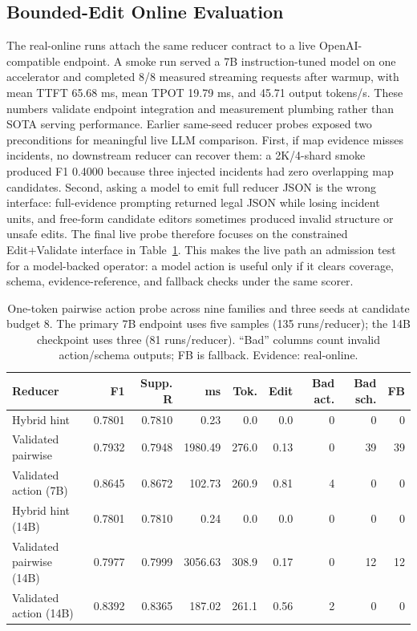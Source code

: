 \documentclass[sigplan,anonymous,nonacm]{acmart}
\begin{document}
\subsection{Bounded-Edit Online Evaluation}

The real-online runs attach the same reducer contract to a live OpenAI-compatible endpoint. A smoke run served a 7B instruction-tuned model on one accelerator and completed 8/8 measured streaming requests after warmup, with mean TTFT 65.68 ms, mean TPOT 19.79 ms, and 45.71 output tokens/s. These numbers validate endpoint integration and measurement plumbing rather than SOTA serving performance. Earlier same-seed reducer probes exposed two preconditions for meaningful live LLM comparison. First, if map evidence misses incidents, no downstream reducer can recover them: a 2K/4-shard smoke produced F1 0.4000 because three injected incidents had zero overlapping map candidates. Second, asking a model to emit full reducer JSON is the wrong interface: full-evidence prompting returned legal JSON while losing incident units, and free-form candidate editors sometimes produced invalid structure or unsafe edits. The final live probe therefore focuses on the constrained \textsf{Edit}+\textsf{Validate} interface in Table~\ref{tab:pairwise-action-online}. This makes the live path an admission test for a model-backed operator: a model action is useful only if it clears coverage, schema, evidence-reference, and fallback checks under the same scorer.

\begin{table}[t]
\caption{One-token pairwise action probe across nine families and three seeds at candidate budget 8. The primary 7B endpoint uses five samples (135 runs/reducer); the 14B checkpoint uses three (81 runs/reducer). ``Bad'' columns count invalid action/schema outputs; FB is fallback. Evidence: real-online.}
\label{tab:pairwise-action-online}
\centering
\normalsize
\begin{tabular*}{\textwidth}{@{\extracolsep{\fill}}lrrrrrrrr}
\toprule
Reducer & F1 & Supp. R & ms & Tok. & Edit & Bad act. & Bad sch. & FB \\
\midrule
Hybrid hint & 0.7801 & 0.7810 & 0.23 & 0.0 & 0.0 & 0 & 0 & 0 \\
Validated pairwise & 0.7932 & 0.7948 & 1980.49 & 276.0 & 0.13 & 0 & 39 & 39 \\
Validated action (7B) & 0.8645 & 0.8672 & 102.73 & 260.9 & 0.81 & 4 & 0 & 0 \\
\midrule
Hybrid hint (14B) & 0.7801 & 0.7810 & 0.24 & 0.0 & 0.0 & 0 & 0 & 0 \\
Validated pairwise (14B) & 0.7977 & 0.7999 & 3056.63 & 308.9 & 0.17 & 0 & 12 & 12 \\
Validated action (14B) & 0.8392 & 0.8365 & 187.02 & 261.1 & 0.56 & 2 & 0 & 0 \\
\bottomrule
\end{tabular*}
\end{table}
\end{document}
